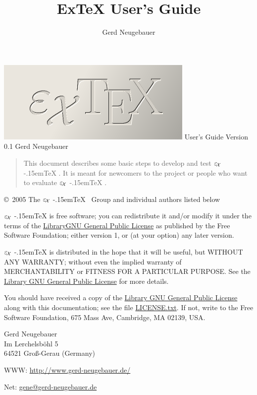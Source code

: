 \documentclass[12pt,div12,a4paper]{scrbook}
\title{ExTeX User's Guide}
\author{Gerd Neugebauer}
\providecommand*{\ExTeX}{\ifx\texorpdfstring\undefined
  \textrm{%
    \ensuremath{\textstyle\varepsilon_{\kern-0.15em\mathcal{X}}}%
    \kern-.15em\TeX}%
  \else\texorpdfstring{%
  \textrm{%
    \ensuremath{\textstyle\varepsilon_{\kern-0.15em\mathcal{X}}}%
    \kern-.15em\TeX
  }}{ExTeX}%
  \fi
}
\newenvironment{abstract}{\begin{quotation}}{\end{quotation}}
\begin{document}

\begin{titlepage}
  \begin{center}
  \vspace*{1pt}
  \vfill
  \includegraphics[width=\textwidth]{ExTeX-splash.png}
  \vfill
  \textsf{\Huge User's Guide}
  \vfill
  \textsf{\Large Version 0.1}
  \vfill
  \textsf{\large Gerd Neugebauer}
  \vfill
  \vfill

  \begin{abstract}
    This document describes some basic steps to develop and test \ExTeX.
    It is meant for newcomers to the project or people who want to
    evaluate \ExTeX.
  \end{abstract}
  \end{center}
\newpage
\footnotesize
\copyright\ 2005 The \ExTeX\ Group and individual authors listed below 

\ExTeX{} is free software; you can redistribute it and/or modify it
under the terms of the \href{LGPL.html}{LibraryGNU General Public
  License} as published by the Free Software Foundation; either
version 1, or (at your option) any later version.

\ExTeX{} is distributed in the hope that it will be useful, but
WITHOUT ANY WARRANTY; without even the implied warranty of
MERCHANTABILITY or FITNESS FOR A PARTICULAR PURPOSE.  See the
\href{LGPL.html}{Library GNU General Public License} for more details.

You should have received a copy of the \href{LGPL.html}{Library GNU
  General Public License} along with this documentation; see the file
\href{LGPL.html}{LICENSE.txt}.  If not, write to the Free Software
Foundation, 675 Mass Ave, Cambridge, MA 02139, USA. 
\vfill

\noindent
Gerd Neugebauer\\
Im Lerchelsb\"ohl 5\\
64521 Gro\ss-Gerau (Germany)\smallskip\par\noindent WWW:
\url{http://www.gerd-neugebauer.de/}
\smallskip\par\noindent Net: \href{mailto://gene@gerd-neugebauer.de}{gene@gerd-neugebauer.de}

\end{titlepage}
\end{document}
